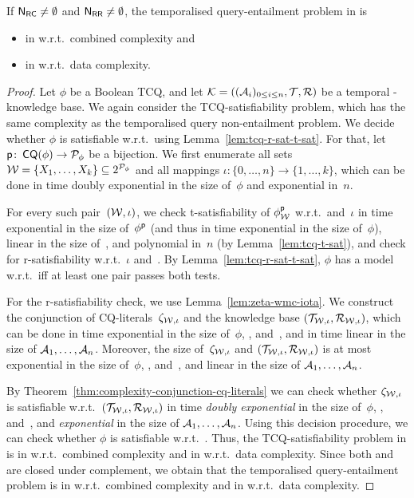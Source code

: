 \begin{theorem}\label{thm:upper-bounds-rigid-names}
    If $\mathsf{N_{RC}}\ne\emptyset$ and $\mathsf{N_{RR}}\ne\emptyset$, the temporalised
    query-entailment problem in \SHQ is
    \begin{itemize}
        \item in \TwoExpTime w.r.t.\ combined complexity and
        \item in \ExpTime w.r.t.\ data complexity.
    \end{itemize}
\end{theorem}

\begin{proof}
    Let $\phi$ be a Boolean TCQ, and let
    $\mathcal{K}=((\mathcal{A}_i)_{0\le i\le n},\mathcal{T},\mathcal{R})$ be a temporal \SHQ-knowledge base.
    We again consider the TCQ-satisfiability problem, which has the same
    complexity as the temporalised query non-entailment problem.  We decide
    whether $\phi$ is satisfiable w.r.t.~\Kmc using
    Lemma~\ref{lem:tcq-r-sat-t-sat}.  For that, let
    $\mathsf{p}\colon\operatorname{\mathsf{CQ}}(\phi)\to\mathcal{P}_\phi$ be a bijection.
    We first enumerate all sets $\mathcal{W}=\{X_1,\dots,X_k\}\subseteq 2^{\mathcal{P}_\phi}$
    and all mappings $\iota\colon\{0,\dots,n\}\to\{1,\dots,k\}$, which can be
    done in time doubly exponential in the size of~$\phi$ and exponential
    in~$n$.

    For every such pair~$(\mathcal{W},\iota)$, we check t-satisfiability of
    $\phi^\mathsf{p}_\mathcal{W}$ w.r.t.~\Wmc and~$\iota$ in time exponential in the size
    of~$\phi^\mathsf{p}$ (and thus in time exponential in the size of~$\phi$), linear
    in the size of~\Wmc, and polynomial in~$n$ (by Lemma~\ref{lem:tcq-t-sat}),
    and check \Wmc for r-satisfiability w.r.t.~$\iota$ and~\Kmc.  By
    Lemma~\ref{lem:tcq-r-sat-t-sat}, $\phi$ has a model w.r.t.~\Kmc iff at least
    one pair passes both tests.

    For the r-satisfiability check, we use Lemma~\ref{lem:zeta-wmc-iota}.  We
    construct the conjunction of CQ-literals~$\zeta_{\mathcal{W},\iota}$ and the
    knowledge base $(\mathcal{T}_{\mathcal{W},\iota},\mathcal{R}_{\mathcal{W},\iota})$, which can be done in
    time exponential in the size of~$\phi$, \Tmc, and~\Rmc, and in time linear
    in the size of $\mathcal{A}_1,\dots,\mathcal{A}_n$.  Moreover, the size
    of~$\zeta_{\mathcal{W},\iota}$ and $(\mathcal{T}_{\mathcal{W},\iota},\mathcal{R}_{\mathcal{W},\iota})$ is at
    most exponential in the size of~$\phi$, \Tmc, and~\Rmc, and linear in the
    size of $\mathcal{A}_1,\dots,\mathcal{A}_n$.

    By Theorem~\ref{thm:complexity-conjunction-cq-literals} we can check whether
    $\zeta_{\mathcal{W},\iota}$ is satisfiable w.r.t.\
    $(\mathcal{T}_{\mathcal{W},\iota},\mathcal{R}_{\mathcal{W},\iota})$ in time \emph{doubly exponential} in
    the size of~$\phi$, \Tmc, and~\Rmc, and \emph{exponential} in the size of
    $\mathcal{A}_1,\dots,\mathcal{A}_n$.
    Using this decision procedure, we can check whether $\phi$ is satisfiable
    w.r.t.~\Kmc.  Thus, the TCQ-satisfiability problem in \SHQ is in \TwoExpTime
    w.r.t.\ combined complexity and in \ExpTime w.r.t.\ data complexity.  Since
    both \TwoExpTime and \ExpTime are closed under complement, we obtain that
    the temporalised query-entailment problem is in \TwoExpTime w.r.t.\ combined
    complexity and in \ExpTime w.r.t.\ data complexity.
\end{proof}

